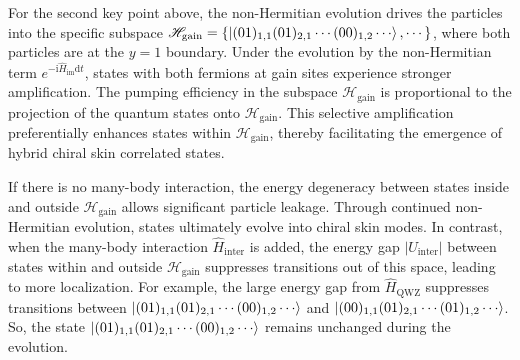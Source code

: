 \documentclass[longbibliography, aps, prx, amsmath, amssymb, amsfonts, twocolumn,superscriptaddress, footinbib]{revtex4-1}
\begin{document}
	
	For the second key point above, the non-Hermitian evolution drives the particles into the specific subspace
	$\mathscr{H}_{\text{gain}}=\left\{ \ket{(01)_{1,1}(01)_{2,1}\cdots(00)_{1,2}\cdots}, \cdots \right\}$,
	where both particles are at the $y=1$ boundary.
	{
	Under the evolution by the non-Hermitian term $e^{-\mathrm{i}\hat{H}_{\text{im}} \mathrm{d}t}$, 
	states with both fermions at gain sites experience stronger amplification.
	The pumping efficiency in the subspace $\mathscr{H}_{\text{gain}}$ is proportional to the projection of the quantum states onto  $\mathscr{H}_{\text{gain}}$. 
	This selective amplification preferentially enhances states within $\mathscr{H}_{\text{gain}}$, thereby facilitating the emergence of hybrid chiral skin correlated states.
	}

    {
    If there is no many-body interaction, the energy degeneracy between states inside and outside $\mathscr{H}_{\text{gain}}$ allows significant particle leakage.
	Through continued non-Hermitian evolution, states ultimately evolve into chiral skin modes.
	In contrast, when the many-body interaction $\hat{H}_{\text{inter}}$ is added, the energy gap $\vert U_{\text{inter}} \vert$ between states within and outside $\mathscr{H}_{\text{gain}}$ suppresses transitions out of this space, leading to more localization. For example, 
	the large energy gap from $\hat{H}_{\text{QWZ}}$ suppresses transitions between $\ket{(01)_{1,1}(01)_{2,1}\cdots(00)_{1,2}\cdots}$ and $\ket{(00)_{1,1}(01)_{2,1}\cdots(01)_{1,2}\cdots}$. 
	So, the state $\ket{(01)_{1,1}(01)_{2,1}\cdots(00)_{1,2}\cdots}$ remains unchanged during the evolution.
	}
\end{document}
